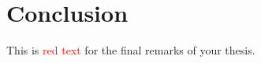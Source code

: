 \documentclass[../main.tex]{subfiles}
\begin{document}
\chapter*{Conclusion}
\label{chap:conclusion}

This is \textcolor{red}{red text} for the final remarks of your thesis.
\end{document}
